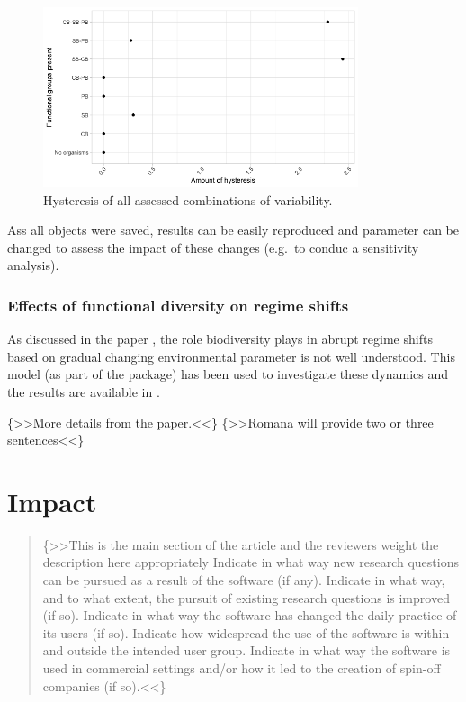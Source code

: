 \documentclass[]{elsarticle} %
\begin{document}
\begin{figure}

{\centering \includegraphics[width=350px]{figures/user_guide_hysteresis} 

}

\caption{Hysteresis of all assessed combinations of variability.}\label{fig:user_guide_hysteresis}
\end{figure}

Ass all objects were saved, results can be easily reproduced and
parameter can be changed to assess the impact of these changes (e.g.~to
conduc a sensitivity analysis).

\hypertarget{effects-of-functional-diversity-on-regime-shifts}{%
\subsubsection{Effects of functional diversity on regime
shifts}\label{effects-of-functional-diversity-on-regime-shifts}}

As discussed in the paper \citep{REF_NEEDED}, the role biodiversity
plays in abrupt regime shifts based on gradual changing environmental
parameter is not well understood. This model (as part of the package)
has been used to investigate these dynamics and the results are
available in \citet{REF_NEEDED}.

{\{\textgreater\textgreater More details from the
paper.\textless\textless\} \{\textgreater\textgreater Romana will
provide two or three sentences\textless\textless\}}

\hypertarget{impact}{%
\section{Impact}\label{impact}}

\begin{quote}
\{\textgreater\textgreater This is the main section of the article and
the reviewers weight the description here appropriately Indicate in what
way new research questions can be pursued as a result of the software
(if any). Indicate in what way, and to what extent, the pursuit of
existing research questions is improved (if so). Indicate in what way
the software has changed the daily practice of its users (if so).
Indicate how widespread the use of the software is within and outside
the intended user group. Indicate in what way the software is used in
commercial settings and/or how it led to the creation of spin-off
companies (if so).\textless\textless\}
\end{quote}
\end{document}
